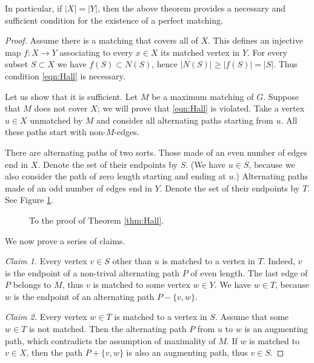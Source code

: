\begin{page}

In particular, if $|X| = |Y|$, then the above theorem provides a necessary and sufficient condition for the existence of a perfect matching.
\begin{proof}
Assume there is a matching that covers all of $X$.
This defines an injective map $f \colon X \to Y$ associating to every $x \in X$ its matched vertex in $Y$.
For every subset $S \subset X$ we have $f(S) \subset N(S)$, hence $|N(S)| \ge |f(S)| = |S|$.
Thus condition \eqref{eqn:Hall} is necessary.

Let us show that it is sufficient.
Let $M$ be a maximum matching of $G$.
Suppose that $M$ does not cover $X$; we will prove that \eqref{eqn:Hall} is violated.
Take a vertex $u \in X$ unmatched by $M$ and consider all alternating paths starting from $u$.
All these paths start with non-$M$-edges.

There are alternating paths of two sorts.
Those made of an even number of edges end in $X$.
Denote the set of their endpoints by $S$.
(We have $u \in S$, because we also consider the path of zero length starting and ending at $u$.)
Alternating paths made of an odd number of edges end in $Y$.
Denote the set of their endpoints by $T$.
See Figure \ref{fig:HallProof}.

\begin{figure}[ht]
\begin{center}

\end{center}
\caption{To the proof of Theorem \ref{thm:Hall}.}
\label{fig:HallProof}
\end{figure}

We now prove a series of claims.

\emph{Claim 1.} Every vertex $v \in S$ other than $u$ is matched to a vertex in $T$.
Indeed, $v$ is the endpoint of a non-trival alternating path $P$ of even length.
The last edge of $P$ belongs to $M$, thus $v$ is matched to some vertex $w \in Y$.
We have $w \in T$, because $w$ is the endpoint of an alternating path $P - \{v,w\}$.

\emph{Claim 2.} Every vertex $w \in T$ is matched to a vertex in $S$.
Assume that some $w \in T$ is not matched.
Then the alternating path $P$ from $u$ to $w$ is an augmenting path, which contradicts the assumption of maximality of $M$.
If $w$ is matched to $v \in X$, then the path $P + \{v,w\}$ is also an augmenting path, thus $v \in S$.


\end{proof}
\end{page}

